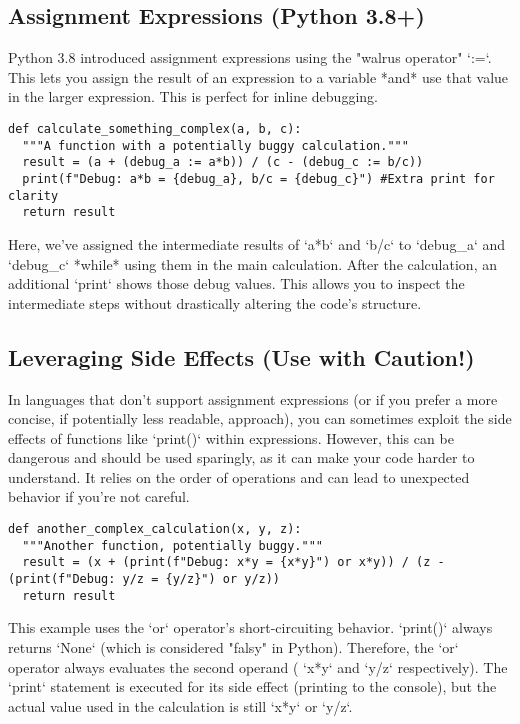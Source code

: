 \documentclass{article}
\begin{document}
\subsection*{Assignment Expressions (Python 3.8+)}

Python 3.8 introduced assignment expressions using the "walrus operator" `:=`.  This lets you assign the result of an expression to a variable *and* use that value in the larger expression.  This is perfect for inline debugging.

\begin{verbatim}
def calculate_something_complex(a, b, c):
  """A function with a potentially buggy calculation."""
  result = (a + (debug_a := a*b)) / (c - (debug_c := b/c))
  print(f"Debug: a*b = {debug_a}, b/c = {debug_c}") #Extra print for clarity
  return result
\end{verbatim}

Here, we've assigned the intermediate results of `a*b` and `b/c` to `debug_a` and `debug_c` *while* using them in the main calculation. After the calculation, an additional `print` shows those debug values. This allows you to inspect the intermediate steps without drastically altering the code's structure.

\subsection*{Leveraging Side Effects (Use with Caution!)}

In languages that don't support assignment expressions (or if you prefer a more concise, if potentially less readable, approach), you can sometimes exploit the side effects of functions like `print()` within expressions.  However, this can be dangerous and should be used sparingly, as it can make your code harder to understand.  It relies on the order of operations and can lead to unexpected behavior if you're not careful.

\begin{verbatim}
def another_complex_calculation(x, y, z):
  """Another function, potentially buggy."""
  result = (x + (print(f"Debug: x*y = {x*y}") or x*y)) / (z - (print(f"Debug: y/z = {y/z}") or y/z))
  return result
\end{verbatim}

This example uses the `or` operator's short-circuiting behavior. `print()` always returns `None` (which is considered "falsy" in Python). Therefore, the `or` operator always evaluates the second operand ( `x*y` and `y/z` respectively). The `print` statement is executed for its side effect (printing to the console), but the actual value used in the calculation is still `x*y` or `y/z`.
\end{document}
